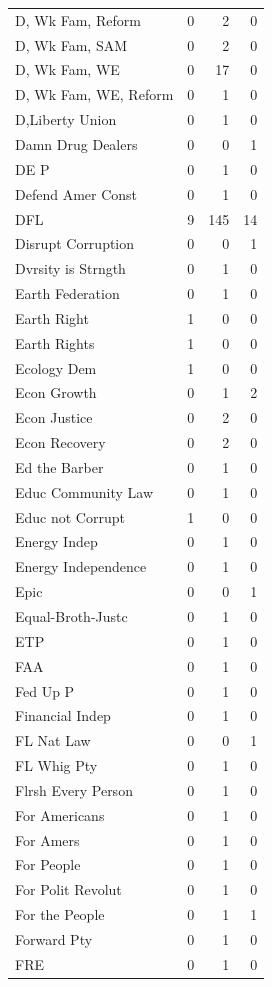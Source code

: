 \begin{supertabular}{lrrr}
D, Wk Fam, Reform & 0 & 2 & 0\\
D, Wk Fam, SAM & 0 & 2 & 0\\
D, Wk Fam, WE & 0 & 17 & 0\\
D, Wk Fam, WE, Reform & 0 & 1 & 0\\
D,Liberty Union & 0 & 1 & 0\\
Damn Drug Dealers & 0 & 0 & 1\\
DE P & 0 & 1 & 0\\
Defend Amer Const & 0 & 1 & 0\\
DFL & 9 & 145 & 14\\
Disrupt Corruption & 0 & 0 & 1\\
Dvrsity is Strngth & 0 & 1 & 0\\
Earth Federation & 0 & 1 & 0\\
Earth Right & 1 & 0 & 0\\
Earth Rights & 1 & 0 & 0\\
Ecology Dem & 1 & 0 & 0\\
Econ Growth & 0 & 1 & 2\\
Econ Justice & 0 & 2 & 0\\
Econ Recovery & 0 & 2 & 0\\
Ed the Barber & 0 & 1 & 0\\
Educ Community Law & 0 & 1 & 0\\
Educ not Corrupt & 1 & 0 & 0\\
Energy Indep & 0 & 1 & 0\\
Energy Independence & 0 & 1 & 0\\
Epic & 0 & 0 & 1\\
Equal-Broth-Justc & 0 & 1 & 0\\
ETP & 0 & 1 & 0\\
FAA & 0 & 1 & 0\\
Fed Up P & 0 & 1 & 0\\
Financial Indep & 0 & 1 & 0\\
FL Nat Law & 0 & 0 & 1\\
FL Whig Pty & 0 & 1 & 0\\
Flrsh Every Person & 0 & 1 & 0\\
For Americans & 0 & 1 & 0\\
For Amers & 0 & 1 & 0\\
For People & 0 & 1 & 0\\
For Polit Revolut & 0 & 1 & 0\\
For the People & 0 & 1 & 1\\
Forward Pty & 0 & 1 & 0\\
FRE & 0 & 1 & 0\\

\end{supertabular}
